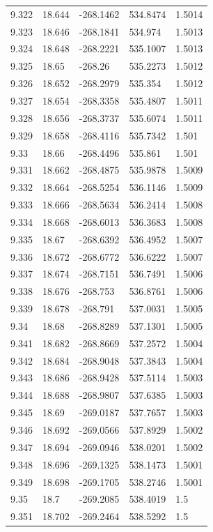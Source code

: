 \begin{tabular}{lllll}
9.322 & 18.644 & -268.1462 & 534.8474 & 1.5014 \\
9.323 & 18.646 & -268.1841 & 534.974 & 1.5013 \\
9.324 & 18.648 & -268.2221 & 535.1007 & 1.5013 \\
9.325 & 18.65 & -268.26 & 535.2273 & 1.5012 \\
9.326 & 18.652 & -268.2979 & 535.354 & 1.5012 \\
9.327 & 18.654 & -268.3358 & 535.4807 & 1.5011 \\
9.328 & 18.656 & -268.3737 & 535.6074 & 1.5011 \\
9.329 & 18.658 & -268.4116 & 535.7342 & 1.501 \\
9.33 & 18.66 & -268.4496 & 535.861 & 1.501 \\
9.331 & 18.662 & -268.4875 & 535.9878 & 1.5009 \\
9.332 & 18.664 & -268.5254 & 536.1146 & 1.5009 \\
9.333 & 18.666 & -268.5634 & 536.2414 & 1.5008 \\
9.334 & 18.668 & -268.6013 & 536.3683 & 1.5008 \\
9.335 & 18.67 & -268.6392 & 536.4952 & 1.5007 \\
9.336 & 18.672 & -268.6772 & 536.6222 & 1.5007 \\
9.337 & 18.674 & -268.7151 & 536.7491 & 1.5006 \\
9.338 & 18.676 & -268.753 & 536.8761 & 1.5006 \\
9.339 & 18.678 & -268.791 & 537.0031 & 1.5005 \\
9.34 & 18.68 & -268.8289 & 537.1301 & 1.5005 \\
9.341 & 18.682 & -268.8669 & 537.2572 & 1.5004 \\
9.342 & 18.684 & -268.9048 & 537.3843 & 1.5004 \\
9.343 & 18.686 & -268.9428 & 537.5114 & 1.5003 \\
9.344 & 18.688 & -268.9807 & 537.6385 & 1.5003 \\
9.345 & 18.69 & -269.0187 & 537.7657 & 1.5003 \\
9.346 & 18.692 & -269.0566 & 537.8929 & 1.5002 \\
9.347 & 18.694 & -269.0946 & 538.0201 & 1.5002 \\
9.348 & 18.696 & -269.1325 & 538.1473 & 1.5001 \\
9.349 & 18.698 & -269.1705 & 538.2746 & 1.5001 \\
9.35 & 18.7 & -269.2085 & 538.4019 & 1.5 \\
9.351 & 18.702 & -269.2464 & 538.5292 & 1.5 \\

\end{tabular}
